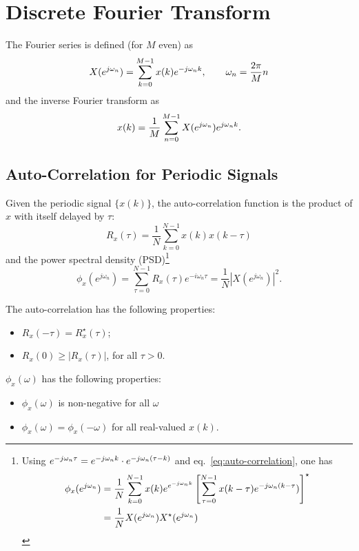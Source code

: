 \section{Discrete Fourier Transform}
\label{sec:DFT}

The Fourier series is defined (for $M$ even) as
\begin{equation}
  \label{eq:fourier-transform}
  X(\ejwn) = \sum_{k=0}^{M-1} x(k) \emjwn[k],\hspace{2em} \omega_n = \frac{2\pi}{M}n
\end{equation}
and the inverse Fourier transform as
\begin{equation}
  \label{eq:inverse-fourier-transform}
  x(k) = \frac{1}{M}\sum_{n=0}^{M-1} X(\ejwn) \ejwn[k].
\end{equation}

\subsection{Auto-Correlation for Periodic Signals}
\label{sec:autocorrelation-periodic}

Given the periodic signal $\{x(k)\}$, the auto-correlation function is the product of $x$ with itself delayed by $\tau$:
\begin{equation}
  \label{eq:auto-correlation}
  R_x(\tau) = \frac{1}{N}\sum_{k=0}^{N-1} x(k)x(k-\tau)
\end{equation}
and the power spectral density (PSD)\footnote{Using $\emjwn[\tau] = \emjwn[k]\cdot \emjwn[(\tau-k)]$ and eq.~\eqref{eq:auto-correlation}, one has
  \begin{align*}
    \phi_x(\ejwn) &= \frac{1}{N}\sum_{k=0}^{N-1} x(k)e^{\emjwn[k]} \left[\sum_{\tau=0}^{N-1} x(k-\tau)\emjwn[(k-\tau])\right]^\star \\
                  &= \frac{1}{N}X(\ejwn) X^\star(\ejwn)
  \end{align*}
}
\begin{equation}
  \label{eq:PSD}
  \phi_x(e^{j\omega_n}) = \sum_{\tau=0}^{N-1} R_x(\tau) e^{-i\omega_n\tau} = \frac{1}{N}|X(e^{j\omega_n})|^2.
\end{equation}

The auto-correlation has the following properties:
\begin{itemize}
\item $R_x(-\tau) = R_x^\star(\tau)$;
\item $R_x(0)\ge |R_x(\tau)|$, for all $\tau>0$.
\end{itemize}
$\phi_x(\omega)$ has the following properties:
\begin{itemize}
\item $\phi_x(\omega)$ is non-negative for all $\omega$
\item $\phi_x(\omega) = \phi_x(-\omega)$ for all real-valued $x(k)$.
\end{itemize}

